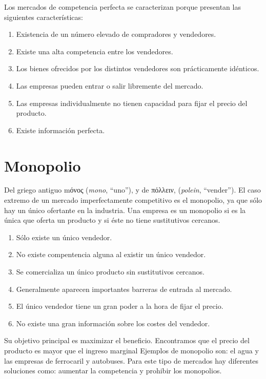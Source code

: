 \documentclass[
]{book}
\providecommand{\tightlist}{%
  \setlength{\itemsep}{0pt}\setlength{\parskip}{0pt}}
\begin{document}
Los mercados de competencia perfecta se caracterizan porque presentan las siguientes características:

\begin{enumerate}
\def\labelenumi{\arabic{enumi}.}
\tightlist
\item
  Existencia de un número elevado de compradores y vendedores.
\item
  Existe una alta competencia entre los vendedores.
\item
  Los bienes ofrecidos por los distintos vendedores son prácticamente idénticos.
\item
  Las empresas pueden entrar o salir libremente del mercado.
\item
  Las empresas individualmente no tienen capacidad para fijar el precio del producto.
\item
  Existe información perfecta.
\end{enumerate}

\hypertarget{monopolio}{%
\section{Monopolio}\label{monopolio}}

Del griego antiguo mόνος (\emph{mono}, ``uno''), y de πόλλειν, (\emph{polein}, ``vender'').
El caso extremo de un mercado imperfectamente competitivo es el monopolio, ya que sólo hay un único ofertante en la industria. Una empresa es un monopolio si es la única que oferta un producto y si éste no tiene sustitutivos cercanos.

\begin{enumerate}
\def\labelenumi{\arabic{enumi}.}
\tightlist
\item
  Sólo existe un único vendedor.
\item
  No existe compentencia alguna al existir un único vendedor.
\item
  Se comercializa un único producto sin sustitutivos cercanos.
\item
  Generalmente aparecen importantes barreras de entrada al mercado.
\item
  El único vendedor tiene un gran poder a la hora de fijar el precio.
\item
  No existe una gran información sobre los costes del vendedor.
\end{enumerate}

Su objetivo principal es maximizar el beneficio. Encontramos que el precio del producto es mayor que el ingreso marginal
Ejemplos de monopolio son: el agua y las empresas de ferrocaril y autobuses.
Para este tipo de mercados hay diferentes soluciones como: aumentar la competencia y prohibir los monopolios.
\end{document}
